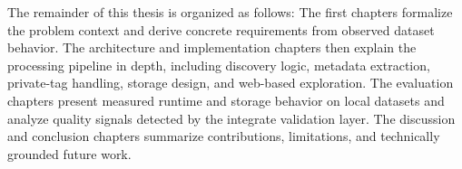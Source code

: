 The remainder of this thesis is organized as follows: The first chapters formalize the problem context and derive concrete requirements from observed dataset behavior. The architecture and implementation chapters then explain the processing pipeline in depth, including discovery logic, metadata extraction, private-tag handling, storage design, and web-based exploration. The evaluation chapters present measured runtime and storage behavior on local datasets and analyze quality signals detected by the integrate validation layer. The discussion and conclusion chapters summarize contributions, limitations, and technically grounded future work.
